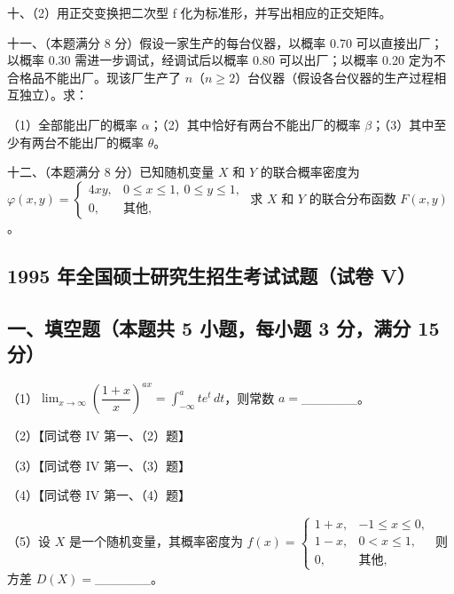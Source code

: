 \documentclass[UTF8,12pt]{ctexart}
\begin{document}
十、（2）用正交变换把二次型 f 化为标准形，并写出相应的正交矩阵。


十一、（本题满分 8 分）假设一家生产的每台仪器，以概率 0.70 可以直接出厂；以概率 0.30 需进一步调试，经调试后以概率 0.80 可以出厂；以概率 0.20 定为不合格品不能出厂。现该厂生产了 \(\displaystyle n\)（\(\displaystyle n\geq2\)）台仪器（假设各台仪器的生产过程相互独立）。求：


（1）全部能出厂的概率 \(\displaystyle \alpha\)；（2）其中恰好有两台不能出厂的概率 \(\displaystyle \beta\)；（3）其中至少有两台不能出厂的概率 \(\displaystyle \theta\)。


十二、（本题满分 8 分）已知随机变量 \(\displaystyle X\) 和 \(\displaystyle Y\) 的联合概率密度为 \(\displaystyle \varphi(x,\allowbreak y)=\begin{cases}4xy,\allowbreak &0\leq x\leq1,\allowbreak \ 0\leq y\leq1,\allowbreak \\0,\allowbreak &\text{其他},\allowbreak \end{cases}\) 求 \(\displaystyle X\) 和 \(\displaystyle Y\) 的联合分布函数 \(\displaystyle F(x,\allowbreak y)\)。


\subsection*{1995 年全国硕士研究生招生考试试题（试卷 V）}

\subsection*{一、填空题（本题共 5 小题，每小题 3 分，满分 15 分）}

（1）\(\displaystyle \lim_{x\to\infty}\left(\dfrac{\displaystyle 1+x}{\displaystyle x}\right)^{ax}=\displaystyle \int_{-\infty}^a te^t\,dt\)，则常数 \(\displaystyle a=\)\_\_\_\_\_\_。


（2）【同试卷 IV 第一、（2）题】


（3）【同试卷 IV 第一、（3）题】


（4）【同试卷 IV 第一、（4）题】


（5）设 \(\displaystyle X\) 是一个随机变量，其概率密度为 \(\displaystyle f(x)=\begin{cases}1+x,\allowbreak &-1\leq x\leq0,\allowbreak \\1-x,\allowbreak &0<x\leq1,\allowbreak \\0,\allowbreak &\text{其他},\allowbreak \end{cases}\) 则方差 \(\displaystyle D(X)=\)\_\_\_\_\_\_。
\end{document}
